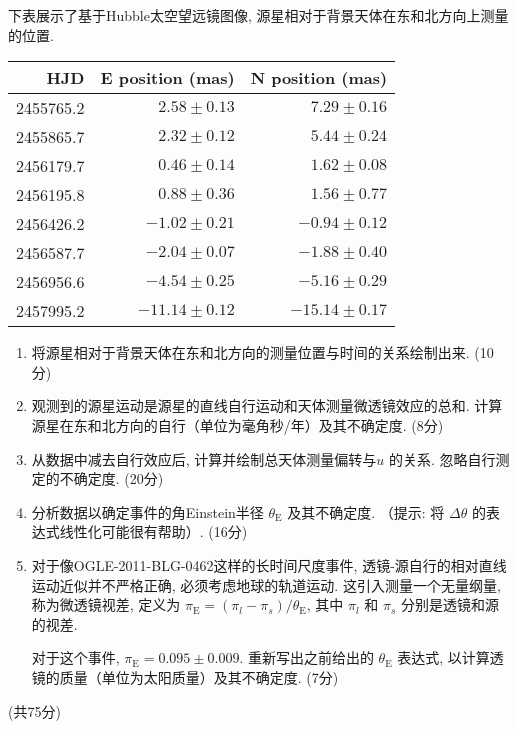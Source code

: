 \documentclass[a4paper,fontset=fandol]{ctexart}
\newcommand{\points}[1]{\par %
	\noindent %
	\hfill (#1分)%
	\vspace{1em}
}
\begin{document}
	下表展示了基于Hubble太空望远镜图像, 源星相对于背景天体在东和北方向上测量的位置. 
	
	\begin{table}[!h]
		\centering
		\begin{tabular}{rrr}
			\toprule
			HJD&E position (mas)&N position (mas)\\
			\midrule
			2455765.2&$2.58\pm0.13$&$7.29\pm0.16$\\
			2455865.7&$2.32\pm0.12$&$5.44\pm0.24$\\
			2456179.7&$0.46\pm0.14$&$1.62\pm0.08$\\
			2456195.8&$0.88\pm0.36$&$1.56\pm0.77$\\
			2456426.2&$-1.02\pm0.21$&$-0.94\pm0.12$\\
			2456587.7&$-2.04\pm0.07$&$-1.88\pm0.40$\\
			2456956.6&$-4.54\pm0.25$&$-5.16\pm0.29$\\
			2457995.2&$-11.14\pm0.12$&$-15.14\pm0.17$\\
			\bottomrule
		\end{tabular}
	\end{table}
	
	\begin{enumerate}[label=(\alph*),start=4]
		\item 将源星相对于背景天体在东和北方向的测量位置与时间的关系绘制出来. \hfill(10分)
		
		\item 观测到的源星运动是源星的直线自行运动和天体测量微透镜效应的总和. 计算源星在东和北方向的自行（单位为毫角秒/年）及其不确定度. \hfill(8分)
		
		\item 从数据中减去自行效应后, 计算并绘制总天体测量偏转与$u$ 的关系. 忽略自行测定的不确定度. \hfill(20分)
		
		\item 分析数据以确定事件的角Einstein半径 $\theta_\mathrm{E}$ 及其不确定度. （提示: 将 $\Delta\theta$ 的表达式线性化可能很有帮助）. \hfill(16分)
		
		\item 对于像OGLE-2011-BLG-0462这样的长时间尺度事件, 透镜-源自行的相对直线运动近似并不严格正确, 必须考虑地球的轨道运动. 这引入测量一个无量纲量, 称为微透镜视差, 定义为 $\pi_\mathrm{E} = (\pi_l - \pi_s) / \theta_\mathrm{E}$, 其中 $\pi_l$ 和 $\pi_s$ 分别是透镜和源的视差. 
		
		对于这个事件, $\pi_\mathrm{E} = 0.095\pm0.009$. 重新写出之前给出的 $\theta_\mathrm{E}$ 表达式, 以计算透镜的质量（单位为太阳质量）及其不确定度. \hfill(7分)
	\end{enumerate}
	\points{共75}
	
\end{document}
